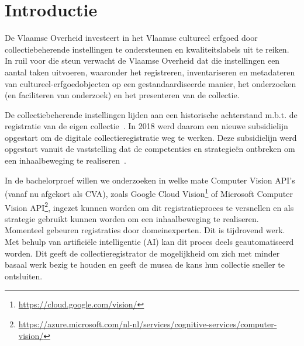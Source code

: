 
\section{Introductie} %

De Vlaamse Overheid investeert in het Vlaamse cultureel erfgoed door collectiebeherende instellingen te ondersteunen en kwaliteitslabels uit te reiken. In ruil voor die steun verwacht de Vlaamse Overheid dat die instellingen een aantal taken uitvoeren, waaronder het registreren, inventariseren en metadateren van cultureel-erfgoedobjecten op een gestandaardiseerde manier, het onderzoeken (en faciliteren van onderzoek) en het presenteren van de collectie.~\autocites{AKE2014}{Gatz2016}

De collectiebeherende instellingen lijden aan een historische achterstand m.b.t. de registratie van de eigen collectie~\autocite{Gatz2016}. In 2018 werd daarom een nieuwe subsidielijn opgestart om de digitale collectieregistratie weg te werken. Deze subsidielijn werd opgestart vanuit de vaststelling dat de competenties en strategie{\"e}n ontbreken om een inhaalbeweging te realiseren~\autocite{JeugdMediaC2018a}.

In de bachelorproef willen we onderzoeken in welke mate Computer Vision API's (vanaf nu afgekort als CVA), zoals Google Cloud Vision\footnote{\url{https://cloud.google.com/vision/}} of Microsoft Computer Vision API\footnote{\url{https://azure.microsoft.com/nl-nl/services/cognitive-services/computer-vision/}}, ingezet kunnen worden om dit registratieproces te versnellen en als strategie gebruikt kunnen worden om een inhaalbeweging te realiseren. Momenteel gebeuren registraties door domeinexperten. Dit is tijdrovend werk. Met behulp van artifici{\"e}le intelligentie (AI) kan dit proces deels geautomatiseerd worden. Dit geeft de collectieregistrator de mogelijkheid om zich met minder basaal werk bezig te houden en geeft de musea de kans hun collectie sneller te ontsluiten.


